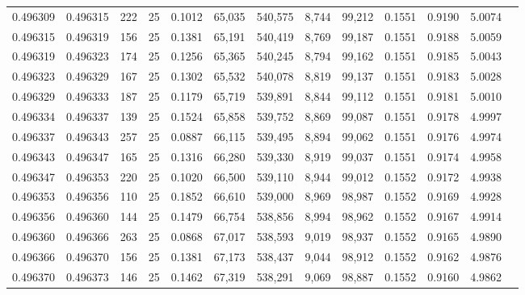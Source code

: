 \begin{tabular}{rrrrrrrrrrrrr}
0.496309 & 0.496315 & 222 &  25 &                                     0.1012 &  65,035 & 540,575 &   8,744 &  99,212 & 0.1551 & 0.9190 & 5.0074 \\
0.496315 & 0.496319 & 156 &  25 &                                     0.1381 &  65,191 & 540,419 &   8,769 &  99,187 & 0.1551 & 0.9188 & 5.0059 \\
0.496319 & 0.496323 & 174 &  25 &                                     0.1256 &  65,365 & 540,245 &   8,794 &  99,162 & 0.1551 & 0.9185 & 5.0043 \\
0.496323 & 0.496329 & 167 &  25 &                                     0.1302 &  65,532 & 540,078 &   8,819 &  99,137 & 0.1551 & 0.9183 & 5.0028 \\
0.496329 & 0.496333 & 187 &  25 &                                     0.1179 &  65,719 & 539,891 &   8,844 &  99,112 & 0.1551 & 0.9181 & 5.0010 \\
0.496334 & 0.496337 & 139 &  25 &                                     0.1524 &  65,858 & 539,752 &   8,869 &  99,087 & 0.1551 & 0.9178 & 4.9997 \\
0.496337 & 0.496343 & 257 &  25 &                                     0.0887 &  66,115 & 539,495 &   8,894 &  99,062 & 0.1551 & 0.9176 & 4.9974 \\
0.496343 & 0.496347 & 165 &  25 &                                     0.1316 &  66,280 & 539,330 &   8,919 &  99,037 & 0.1551 & 0.9174 & 4.9958 \\
0.496347 & 0.496353 & 220 &  25 &                                     0.1020 &  66,500 & 539,110 &   8,944 &  99,012 & 0.1552 & 0.9172 & 4.9938 \\
0.496353 & 0.496356 & 110 &  25 &                                     0.1852 &  66,610 & 539,000 &   8,969 &  98,987 & 0.1552 & 0.9169 & 4.9928 \\
0.496356 & 0.496360 & 144 &  25 &                                     0.1479 &  66,754 & 538,856 &   8,994 &  98,962 & 0.1552 & 0.9167 & 4.9914 \\
0.496360 & 0.496366 & 263 &  25 &                                     0.0868 &  67,017 & 538,593 &   9,019 &  98,937 & 0.1552 & 0.9165 & 4.9890 \\
0.496366 & 0.496370 & 156 &  25 &                                     0.1381 &  67,173 & 538,437 &   9,044 &  98,912 & 0.1552 & 0.9162 & 4.9876 \\
0.496370 & 0.496373 & 146 &  25 &                                     0.1462 &  67,319 & 538,291 &   9,069 &  98,887 & 0.1552 & 0.9160 & 4.9862 \\

\end{tabular}
